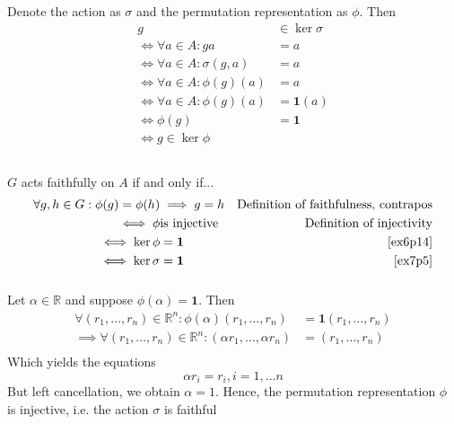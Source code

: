 \documentclass{article}
\newcommand{\reals}{\mathbb{R}}
\newcommand{\id}{ \bm{1} }
\begin{document}
\subsubsection{}\label{ex7p5}
Denote the action as $\sigma$ and the permutation representation as $\phi$. Then
\begin{align*}
g &\in \ker\sigma\\
\iff \forall a\in A: ga&=a\\
\iff \forall a\in A: \sigma(g,a)&=a\\
\iff \forall a\in A: \phi(g)(a)&=a\\
\iff \forall a\in A: \phi(g)(a)&=\id(a)\\
\iff \phi(g)&=\id\\
\iff g \in \ker\phi\\
\end{align*}
\subsubsection{}\label{ex7p6}
$G$ acts faithfully on $A$ if and only if...
\begin{align*}
\forall g,h\in G: \phi(g) = \phi(h) &\implies g=h & \mbox{Definition of faithfulness, contrapos}\\
\iff \phi & \mbox{is injective} & \mbox{Definition of injectivity}\\
\iff \ker\phi &= \id & \mbox{\ref{ex6p14}}\\
\iff \ker\sigma &= \id & \mbox{\ref{ex7p5}}\\
\end{align*}
\subsubsection{}\label{ex7p7}
Let $\alpha\in\reals$ and suppose $\phi(\alpha) = \id$. Then
\begin{align*}
\forall(r_1,\ldots,r_n)\in\reals^n: \phi(\alpha)(r_1,\ldots,r_n) &= \id(r_1,\ldots,r_n)\\
\implies \forall(r_1,\ldots,r_n)\in\reals^n: (\alpha r_1,\ldots,\alpha r_n) &= (r_1,\ldots,r_n)\\
\end{align*}
Which yields the equations 
\begin{equation}
\alpha r_i = r_i, i=1,\ldots n
\end{equation}
But left cancellation, we obtain $\alpha = 1$. Hence, the permutation representation $\phi$ is injective, i.e. the action $\sigma$ is faithful
\end{document}
